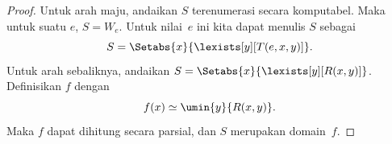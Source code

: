 \documentclass[../../../include/open-logic-section]{subfiles}
\begin{document}
\begin{proof}
Untuk arah maju, andaikan $S$ terenumerasi secara komputabel. Maka untuk suatu
$e$, $S = W_e$. Untuk nilai~$e$ ini kita dapat menulis $S$ sebagai
\[
S = \Setabs{ x }{ \lexists[y][T(e, x, y)] }.
\]
Untuk arah sebaliknya, andaikan $S = \Setabs{ x }{
  \lexists[y][R(x, y)] }$. Definisikan $f$ dengan
\[
f(x) \simeq \umin{y}{R(x, y)}.
\]
Maka $f$ dapat dihitung secara parsial, dan $S$ merupakan domain~$f$.
\end{proof}
\end{document}
